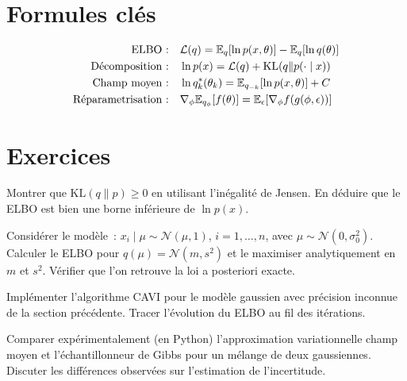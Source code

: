 \section{Formules cl\'es}

\begin{formules}
\begin{align}
  \text{ELBO :} \quad & \mathcal{L}(q) = \mathbb{E}_q[\ln p(x,\theta)] - \mathbb{E}_q[\ln q(\theta)] \\
  \text{D\'ecomposition :} \quad & \ln p(x) = \mathcal{L}(q) + \mathrm{KL}(q \| p(\cdot \mid x)) \\
  \text{Champ moyen :} \quad & \ln q_k^*(\theta_k) = \mathbb{E}_{q_{-k}}[\ln p(x,\theta)] + C \\
  \text{R\'eparametrisation :} \quad & \nabla_\phi \mathbb{E}_{q_\phi}[f(\theta)]
    = \mathbb{E}_\epsilon[\nabla_\phi f(g(\phi,\epsilon))]
\end{align}
\end{formules}

\section{Exercices}

\begin{exercice}
Montrer que $\mathrm{KL}(q \| p) \geq 0$ en utilisant l'in\'egalit\'e de Jensen.
En d\'eduire que le ELBO est bien une borne inf\'erieure de $\ln p(x)$.
\end{exercice}

\begin{exercice}
Consid\'erer le mod\`ele~: $x_i \mid \mu \sim \mathcal{N}(\mu, 1)$, $i=1,\ldots,n$,
avec $\mu \sim \mathcal{N}(0, \sigma_0^2)$. Calculer le ELBO pour
$q(\mu) = \mathcal{N}(m, s^2)$ et le maximiser analytiquement en $m$ et $s^2$.
V\'erifier que l'on retrouve la loi a posteriori exacte.
\end{exercice}

\begin{exercice}
Impl\'ementer l'algorithme CAVI pour le mod\`ele gaussien avec pr\'ecision
inconnue de la section pr\'ec\'edente. Tracer l'\'evolution du ELBO au fil
des it\'erations.
\end{exercice}

\begin{exercice}
Comparer exp\'erimentalement (en Python) l'approximation variationnelle
champ moyen et l'\'echantillonneur de Gibbs pour un m\'elange de deux
gaussiennes. Discuter les diff\'erences observ\'ees sur l'estimation
de l'incertitude.
\end{exercice}

